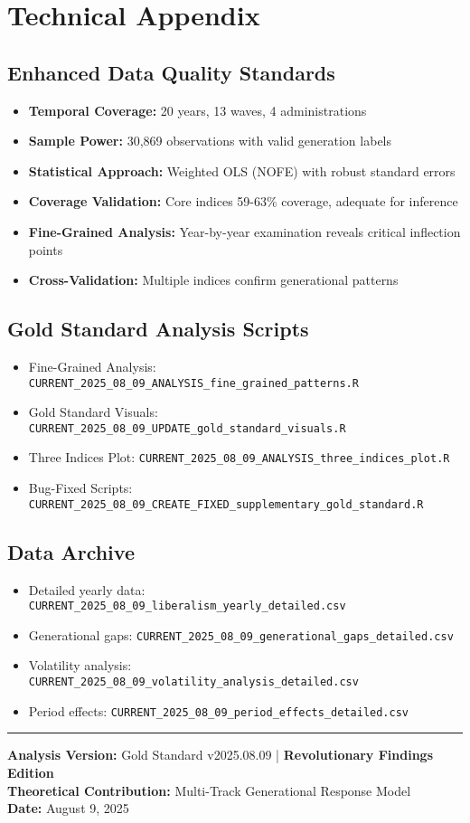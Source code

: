 \documentclass[11pt,letterpaper]{article}
\newcommand{\compactdesc}[2]{\item \textbf{#1:} #2}
\begin{document}
\section{Technical Appendix}

\subsection{Enhanced Data Quality Standards}
\begin{itemize}
    \compactdesc{Temporal Coverage}{20 years, 13 waves, 4 administrations}
    \compactdesc{Sample Power}{30,869 observations with valid generation labels}
    \compactdesc{Statistical Approach}{Weighted OLS (NOFE) with robust standard errors}
    \compactdesc{Coverage Validation}{Core indices 59-63\% coverage, adequate for inference}
    \compactdesc{Fine-Grained Analysis}{Year-by-year examination reveals critical inflection points}
    \compactdesc{Cross-Validation}{Multiple indices confirm generational patterns}
\end{itemize}

\subsection{Gold Standard Analysis Scripts}
\begin{itemize}
    \item Fine-Grained Analysis: \texttt{CURRENT\_2025\_08\_09\_ANALYSIS\_fine\_grained\_patterns.R}
    \item Gold Standard Visuals: \texttt{CURRENT\_2025\_08\_09\_UPDATE\_gold\_standard\_visuals.R}
    \item Three Indices Plot: \texttt{CURRENT\_2025\_08\_09\_ANALYSIS\_three\_indices\_plot.R}
    \item Bug-Fixed Scripts: \texttt{CURRENT\_2025\_08\_09\_CREATE\_FIXED\_supplementary\_gold\_standard.R}
\end{itemize}

\subsection{Data Archive}
\begin{itemize}
    \item Detailed yearly data: \texttt{CURRENT\_2025\_08\_09\_liberalism\_yearly\_detailed.csv}
    \item Generational gaps: \texttt{CURRENT\_2025\_08\_09\_generational\_gaps\_detailed.csv}
    \item Volatility analysis: \texttt{CURRENT\_2025\_08\_09\_volatility\_analysis\_detailed.csv}
    \item Period effects: \texttt{CURRENT\_2025\_08\_09\_period\_effects\_detailed.csv}
\end{itemize}

\vspace{1em}
\noindent\rule{\textwidth}{0.2pt}

\begin{center}
\textbf{Analysis Version:} Gold Standard v2025.08.09 | \textbf{Revolutionary Findings Edition}\\
\textbf{Theoretical Contribution:} Multi-Track Generational Response Model\\
\textbf{Date:} August 9, 2025
\end{center}
\end{document}
